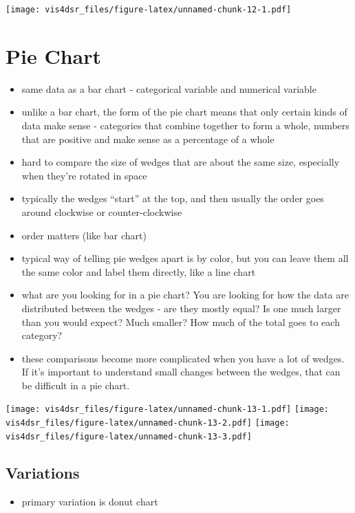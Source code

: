 \documentclass[
]{krantz}
\providecommand{\tightlist}{%
  \setlength{\itemsep}{0pt}\setlength{\parskip}{0pt}}
\begin{document}
\texttt{[image: vis4dsr\_files/figure-latex/unnamed-chunk-12-1.pdf]}

\hypertarget{pie-chart}{%
\section{Pie Chart}\label{pie-chart}}

\begin{itemize}
\tightlist
\item
  same data as a bar chart - categorical variable and numerical variable
\item
  unlike a bar chart, the form of the pie chart means that only certain kinds
  of data make sense - categories that combine together to form a whole, numbers that
  are positive and make sense as a percentage of a whole
\item
  hard to compare the size of wedges that are about the same size, especially
  when they're rotated in space
\item
  typically the wedges ``start'' at the top, and then usually the order goes around
  clockwise or counter-clockwise
\item
  order matters (like bar chart)
\item
  typical way of telling pie wedges apart is by color, but you can leave them all
  the same color and label them directly, like a line chart
\item
  what are you looking for in a pie chart? You are looking for how the data are
  distributed between the wedges - are they mostly equal? Is one much larger than
  you would expect? Much smaller? How much of the total goes to each category?
\item
  these comparisons become more complicated when you have a lot of wedges. If it's
  important to understand small changes between the wedges, that can be difficult
  in a pie chart.
\end{itemize}

\texttt{[image: vis4dsr\_files/figure-latex/unnamed-chunk-13-1.pdf]} \texttt{[image: vis4dsr\_files/figure-latex/unnamed-chunk-13-2.pdf]} \texttt{[image: vis4dsr\_files/figure-latex/unnamed-chunk-13-3.pdf]}

\hypertarget{variations-3}{%
\subsection{Variations}\label{variations-3}}

\begin{itemize}
\tightlist
\item
  primary variation is donut chart
\end{itemize}
\end{document}
